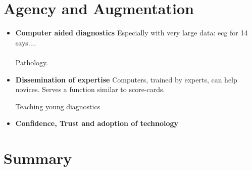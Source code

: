 \documentclass[9pt,twocolumn,twoside]{pnas-new}
\begin{document}
\section*{Agency and Augmentation}
\begin{itemize}
\item{\bf Computer aided diagnostics}
  Especially with very large data: ecg for 14 says.... \\
  ~\\

Pathology.

\item {\bf Dissemination of expertise}
Computers, trained by experts, can help novices.  Serves a function
similar to score-cards.

Teaching young diagnostics
\item { \bf Confidence, Trust and adoption of technology}
\end{itemize}

\section*{Summary}

% 

\end{document}
